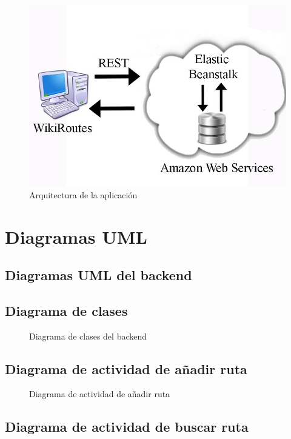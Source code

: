 \documentclass[11pt,a4paper]{article}
\begin{document}
\begin{figure}[htbp]
\centering
\includegraphics[width=0.7\linewidth]{imagenes/arquitectura}
\caption{Arquitectura de la aplicación}
\label{fig:arquitectura}
\end{figure}


\clearpage

\section{Diagramas UML}

\subsection{Diagramas UML del backend}

\subsection{Diagrama de clases}

\begin{figure}
\centering
\clasesbackend
\caption{Diagrama de clases del backend}
\label{fig:clases_backend}
\end{figure}

\subsection{Diagrama de actividad de añadir ruta}

\begin{figure}[htbp]
\centering
\anadirruta
\caption{Diagrama de actividad de añadir ruta}
\label{fig:anadirruta}
\end{figure}


\subsection{Diagrama de actividad de buscar ruta}
\end{document}

